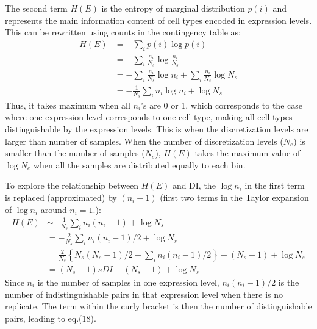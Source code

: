 The second term $H(E)$ is the entropy of marginal distribution $p(i)$ and represents the main information content of cell types encoded in expression levels. This can be rewritten using counts in the contingency table as:
\begin{align}
H(E) &= -\sum_{i}p(i)\log p(i) \\
     &= -\sum_{i}\frac{n_i}{N_s} \log \frac{n_i}{N_s} \\
     &= -\sum_{i}\frac{n_i}{N_s} \log n_i + \sum_{i}\frac{n_i}{N_s}\log N_s \\
     &= - \frac{1}{N_s}\sum_{i}n_i\log n_i + \log N_s
\end{align}
Thus, it takes maximum when all $n_i$'s are 0 or 1, which corresponds to the case where one expression level corresponds to one cell type, making all cell types distinguishable by the expression levels. This is when the discretization levels are larger than number of samples. When the number of discretization levels ($N_e$) is smaller than the number of samples ($N_s$), $H(E)$ takes the maximum value of $\log N_e$ when all the samples are distributed equally to each bin.

To explore the relationship between $H(E)$ and DI, the $\log n_i$ in the first term is replaced (approximated) by $(n_i-1)$ (first two terms in the Taylor expansion of $\log n_i$ around $n_i=1$.):
\begin{align}
H(E) &\sim -\frac{1}{N_s}\sum_{i}n_i (n_i-1) + \log N_s \\
	 &= -\frac{2}{N_s}\sum_{i}n_i (n_i-1)/2 + \log N_s \\
     &=  \frac{2}{N_s}\left\{N_s(N_s-1)/2 - \sum_{i}n_i (n_i-1)/2\right\} - (N_s-1) + \log N_s \\
     &= (N_s-1) sDI - (N_s-1) + \log N_s 
\end{align}
Since $n_i$ is the number of samples in one expression level, $n_i(n_i-1)/2$ is the number of indistinguishable pairs in that expression level when there is no replicate. The term within the curly bracket is then the number of distinguishable pairs, leading to eq.(18). 

